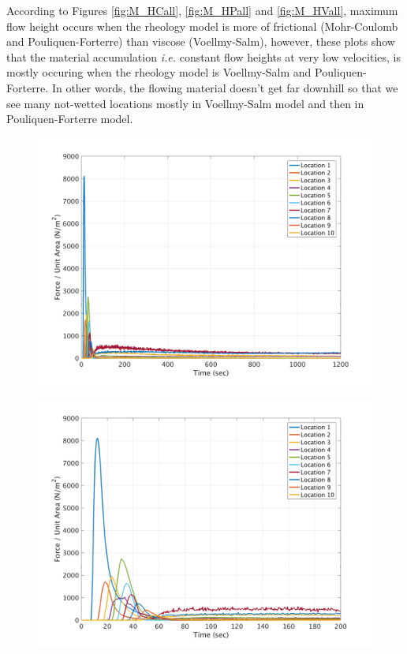 \documentclass[a4paper,10pt]{article}
\begin{document}
According to Figures \ref{fig:M_HCall}, \ref{fig:M_HPall} and \ref{fig:M_HVall}, maximum flow height occurs when the rheology model is more of frictional (Mohr-Coulomb and Pouliquen-Forterre) than viscose (Voellmy-Salm), however, these plots show that the material accumulation \textit{i.e.} constant flow heights at very low velocities, is mostly occuring when the rheology model is Voellmy-Salm and Pouliquen-Forterre. In other words, the flowing material doesn't get far downhill so that we see many not-wetted locations mostly in Voellmy-Salm model and then in Pouliquen-Forterre model. 

\begin{figure}[H]

	\begin{minipage}[b]{0.5\linewidth}
	\centering
    \includegraphics[width=1\textwidth]{MeansAll/FnetC.png}     
        \label{fig:M_FnC}
	\end{minipage}
	\begin{minipage}[b]{0.5\linewidth}
	\centering
    \includegraphics[width=1\textwidth]{MeansAll/FnetC_0-200.png}     
        \label{fig:M_FnCz}
	\end{minipage}
	

\end{figure}
\end{document}
